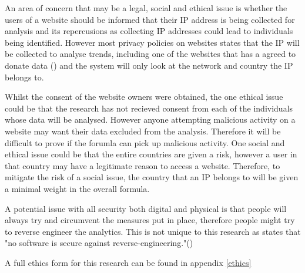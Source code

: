 
An area of concern that may be a legal, social and ethical issue is whether the users of a website should be informed that their IP address is being collected for analysis and its repercusions as collecting IP addresses could lead to individuals being identified. However most privacy policies on websites states that the IP will be collected to analyse trends, including one of the websites that has a agreed to donate data (\cite{PetersWebPrivacy}) and the system will only look at the network and country the IP belongs to.


Whilst the  consent of the website owners were obtained, the one ethical issue could be that the research has not recieved consent from each of the individuals whose data will be analysed. However anyone attempting malicious activity on a website may want their data excluded from the analysis. Therefore it will be difficult to prove if the forumla can pick up malicious activity. One social and ethical issue could be that the entire countries are given a risk, however a user in that country may have a legitimate reason to access a website. Therefore, to mitigate the risk of a social issue, the country that an IP belongs to will be given a minimal weight in the overall formula. 

A potential issue with all security both digital and physical is that people will always try and circumvent the measures put in place, therefore people might try to reverse engineer the analytics. This is not unique to this research as \citeauthor{708447} states that "no software is secure against reverse-engineering."(\cite{708447})

A full ethics form for this research can be found in appendix \ref{ethics}

